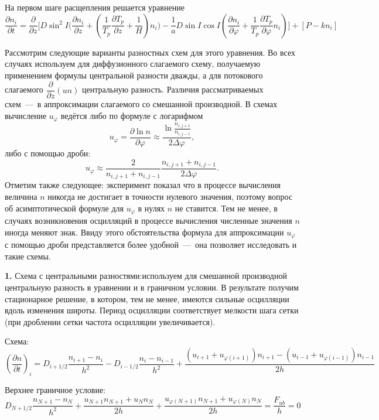 \documentclass[2pt, a4paper, fleqn]{extarticle}
\begin{document}
На первом шаге расщепления решается уравнение $$\dfrac{\partial n_i}{\partial t} = \dfrac{\partial}{\partial z}\bigg[D\sin^2 I \bigg(\dfrac{\partial n_i}{\partial z}+\left(\dfrac{1}{T_p}\dfrac{\partial T_p}{\partial z}+\dfrac{1}{H}\right)n_i\bigg)-\dfrac{1}{a}D\sin I\cos I\left(\dfrac{\partial n_i}{\partial\varphi}+\dfrac{1}{T_p}\dfrac{\partial T_p}{\partial \varphi}n_i\right)\bigg]+[P-kn_i]$$

Рассмотрим следующие варианты разностных схем для этого уравнения. Во всех случаях используем для диффузионного слагаемого схему, получаемую применением формулы центральной разности дважды, а для потокового слагаемого $\dfrac{\partial}{\partial z} (un)$ центральную разность. Различия рассматриваемых схем~---~в аппроксимации слагаемого со смешанной производной. В схемах вычисление $u_\varphi$ ведётся либо по формуле с логарифмом $$u_\varphi = \dfrac{\partial \ln n}{\partial\varphi}\approx \dfrac{\ln\frac{n_{i, j+1}}{n_{i, j-1}}}{2\Delta\varphi},$$ либо с помощью дроби: $$u_\varphi \approx \dfrac{2}{n_{i, j+1}+n_{i, j-1}}\dfrac{n_{i, j+1}+n_{i, j-1}}{2\Delta\varphi}.$$ Отметим также следующее: эксперимент показал что в процессе вычисления величина $n$ никогда не достигает в точности нулевого значения, поэтому вопрос об асимптотической формуле для $u_\varphi$ в нулях $n$ не ставится. Тем не менее, в случаях возникновения осцилляций в процессе вычисления численные значения $n$ иногда меняют знак. Ввиду этого обстоятельства формула для аппроксимации $u_\varphi$ с помощью дроби представляется более удобной~---~она позволяет исследовать и такие схемы.

\medskip

{\bf 1.} Схема с центральными разностями:используем для смешанной производной центральную разность в уравнении и в граничном условии. В результате получим стационарное решение, в котором, тем не менее, имеются сильные осцилляции вдоль изменения широты. Период осцилляции соответствует мелкости шага сетки (при дроблении сетки частота осцилляции увеличивается).

Схема: $$\left(\dfrac{\partial n}{\partial t}\right)_i = D_{i+1/2}\dfrac{n_{i+1}-n_i}{h^2} - D_{i-1/2}\dfrac{n_{i}-n_{i-1}}{h^2}+\dfrac{(u_{i+1}+u_{\varphi(i+1)})n_{i+1}-(u_{i-1}+u_{\varphi(i-1)})n_{i-1}}{2h}$$

Верхнее граничное условие: $$D_{N+1/2}\dfrac{n_{N+1}-n_{N}}{h^2}+\dfrac{u_{N+1}n_{N+1}+u_{N}n_{N}}{2h}+\dfrac{u_{\varphi(N+1)}n_{N+1}+u_{\varphi(N)}n_{N}}{2h} = \dfrac{F_{ub}}{h} = 0$$

\medskip
\end{document}
